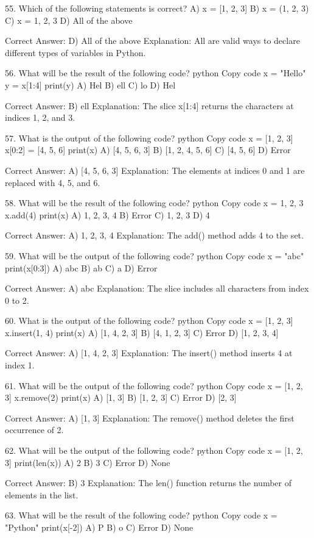 55. Which of the following statements is correct?
A) x = [1, 2, 3]
B) x = (1, 2, 3)
C) x = {1, 2, 3}
D) All of the above

Correct Answer: D) All of the above
Explanation: All are valid ways to declare different types of variables in Python.

56. What will be the result of the following code?
python
Copy code
x = "Hello"
y = x[1:4]
print(y)
A) Hel
B) ell
C) lo
D) Hel

Correct Answer: B) ell
Explanation: The slice x[1:4] returns the characters at indices 1, 2, and 3.

57. What is the output of the following code?
python
Copy code
x = [1, 2, 3]
x[0:2] = [4, 5, 6]
print(x)
A) [4, 5, 6, 3]
B) [1, 2, 4, 5, 6]
C) [4, 5, 6]
D) Error

Correct Answer: A) [4, 5, 6, 3]
Explanation: The elements at indices 0 and 1 are replaced with 4, 5, and 6.

58. What will be the result of the following code?
python
Copy code
x = {1, 2, 3}
x.add(4)
print(x)
A) {1, 2, 3, 4}
B) Error
C) {1, 2, 3}
D) {4}

Correct Answer: A) {1, 2, 3, 4}
Explanation: The add() method adds 4 to the set.

59. What will be the output of the following code?
python
Copy code
x = "abc"
print(x[0:3])
A) abc
B) ab
C) a
D) Error

Correct Answer: A) abc
Explanation: The slice includes all characters from index 0 to 2.

60. What is the output of the following code?
python
Copy code
x = [1, 2, 3]
x.insert(1, 4)
print(x)
A) [1, 4, 2, 3]
B) [4, 1, 2, 3]
C) Error
D) [1, 2, 3, 4]

Correct Answer: A) [1, 4, 2, 3]
Explanation: The insert() method inserts 4 at index 1.

61. What will be the output of the following code?
python
Copy code
x = [1, 2, 3]
x.remove(2)
print(x)
A) [1, 3]
B) [1, 2, 3]
C) Error
D) [2, 3]

Correct Answer: A) [1, 3]
Explanation: The remove() method deletes the first occurrence of 2.

62. What will be the output of the following code?
python
Copy code
x = [1, 2, 3]
print(len(x))
A) 2
B) 3
C) Error
D) None

Correct Answer: B) 3
Explanation: The len() function returns the number of elements in the list.

63. What will be the result of the following code?
python
Copy code
x = "Python"
print(x[-2])
A) P
B) o
C) Error
D) None

